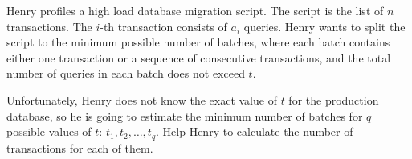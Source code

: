 Henry profiles a high load database migration script. The script is the list of $n$ transactions. The $i$-th transaction consists of $a_i$ queries. Henry wants to split the script to the minimum possible number of batches, where each batch contains either one transaction or a sequence of consecutive transactions, and the total number of queries in each batch does not exceed $t$.

Unfortunately, Henry does not know the exact value of $t$ for the production database, so he is going to estimate the minimum number of batches for $q$ possible values of $t$: $t_1, t_2, \ldots, t_q$. Help Henry to calculate the number of transactions for each of them.